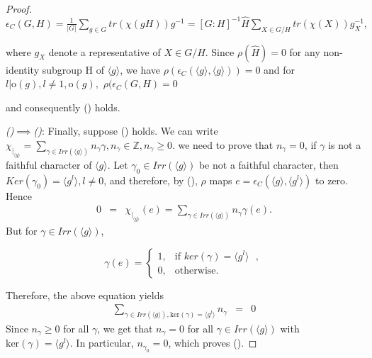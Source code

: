 \documentclass[12pt, reqno]{amsart}
\numberwithin{equation}{section}
\theoremstyle{definition}
\theoremstyle{remark}
\theoremstyle{plain}
\begin{document}
\begin{proof}
 $\epsilon_C(G, H) = \frac{1}{|G|}\sum_{g\in G}tr(\chi(gH))g^{-1} = [G:H]^{-1}\hat{H}\sum_{X\in G/H}tr(\chi(X))g^{-1}_X,$
 
 where $g_X$ denote a representative of $X\in G/H$. Since $\rho(\hat{H})=0$ for any non-identity subgroup H of $\langle g \rangle$, we have $\rho(\epsilon_C(\langle g \rangle, \langle g \rangle))=0$ and for $l|\text{o}(g), l\neq 1, \text{o}(g),$ $\rho(\epsilon_C(G, H)=0$\smallskip
 
 and consequently () holds.\smallskip
 
 {\it()}$\implies${\it()}: Finally, suppose () holds. We can write $\chi_{|_{\langle g \rangle}}=\sum_{\gamma\in Irr(\langle g \rangle)}n_\gamma\gamma,    n_\gamma\in \mathbb{Z}, n_\gamma\geq0$. we need to prove that $n_\gamma=0$, if $\gamma$ is not a faithful character of $\langle g\rangle$. Let $\gamma_0\in Irr(\langle g\rangle)$ be not a faithful character, then $Ker(\gamma_0)=\langle g^l\rangle, l\neq0$, and therefore, by (), $\rho$ maps $e=\epsilon_C(\langle g\rangle, \langle g^l\rangle)$ to zero. Hence
  \begin{eqnarray}\nonumber
    0 &=& \chi_{|_{\langle g\rangle}}(e)=\sum_{\gamma\in Irr(\langle g\rangle)}n_\gamma\gamma(e).
  \end{eqnarray}
 But for $\gamma\in Irr(\langle g\rangle)$,
 \begin{center}
 \[
\gamma(e) =
\begin{cases}
1, & \text{if $ker(\gamma)=\langle g^l\rangle$ },\\
0, & \text{otherwise}.
\end{cases}
 \]
 \end{center} 
 Therefore, the above equation yields
 \begin{eqnarray}\nonumber
   \sum_{\gamma\in Irr(\langle g\rangle), \text{ker}(\gamma)=\langle g^l\rangle}n_\gamma &=&0
 \end{eqnarray}
Since $n_\gamma\geq0$ for all $\gamma$, we get that $n_\gamma=0$ for all $\gamma\in Irr(\langle g\rangle)$ with $\text{ker}(\gamma)=\langle g^l\rangle$. In particular, $n_{\gamma_0}=0$, which proves ().
\end{proof} 
\end{document}
